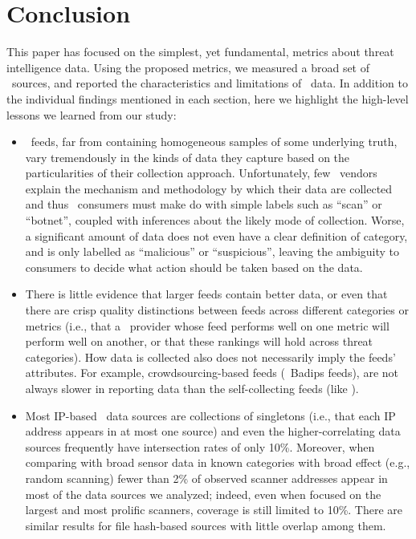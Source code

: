 \section{Conclusion}
\label{sec:conclusion}

This paper has focused on the simplest, yet fundamental, metrics about
threat intelligence data. Using the proposed metrics, we measured a broad
set of \ti\ sources, and reported the characteristics and limitations of
\ti\ data. In addition to the individual findings mentioned in each section, here
we highlight the high-level lessons we learned from our study:


\begin{itemize}
	\item \ti\ feeds, far from containing
    homogeneous samples of some underlying truth, vary tremendously in the
    kinds of data they capture based on the particularities of their
    collection approach. Unfortunately, few \ti\ vendors explain the
    mechanism and methodology by which their data are collected and thus
    \ti\ consumers must make do with simple labels such as
    ``scan'' or ``botnet'', coupled with inferences about the
    likely mode of collection. Worse, a significant amount of data does not
    even have a clear definition of category, and is only labelled as
    ``malicious'' or ``suspicious'', leaving the ambiguity to consumers to
    decide what action should be taken based on the data.

    \item There is little evidence
    that larger feeds contain better data, or even that there are
    crisp quality distinctions between feeds across different categories
    or metrics (i.e., that a \ti\ provider whose feed performs well on one
    metric will perform well on another, or that these rankings will hold
    across threat categories). How data is collected also does not
    necessarily imply the feeds' attributes. For example, crowdsourcing-based feeds (\eg\ Badips feeds), are not always slower in reporting data
    than the self-collecting feeds (like \feedetiprep).

    \item Most IP-based \ti\ data sources are collections of
    singletons (i.e., that each IP address appears in at most one source)
    and even the higher-correlating data sources frequently have
    intersection rates of only 10\%. Moreover, when comparing with broad
    sensor data in known categories with broad effect (e.g., random
    scanning) fewer than 2\% of observed scanner addresses appear in most of
    the data sources we analyzed; indeed, even when focused on the largest
    and most prolific scanners, coverage is still limited to 10\%. There
    are similar results for file hash-based sources with little overlap
    among them.
\end{itemize}

